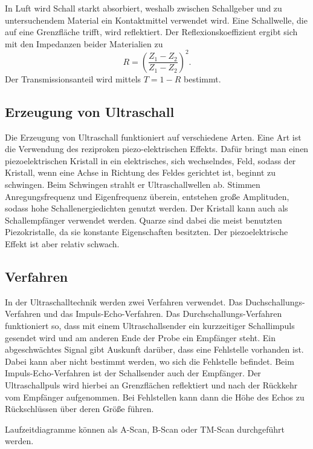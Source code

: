 In Luft wird Schall starkt absorbiert, weshalb zwischen 
Schallgeber und zu untersuchendem Material ein Kontaktmittel 
verwendet wird. 
Eine Schallwelle, die auf eine Grenzfläche trifft, wird 
reflektiert. Der Reflexionskoeffizient ergibt sich mit den 
Impedanzen beider Materialien zu 
\begin{equation*}
    R = (\frac{Z_1-Z_2}{Z_1-Z_2})^2.
\end{equation*}
Der Transmissionsanteil wird mittels $T= 1-R$ bestimmt. 

\subsection{Erzeugung von Ultraschall}
\noindent Die Erzeugung von Ultraschall funktioniert auf verschiedene 
Arten. Eine Art ist die Verwendung des reziproken 
piezo-elektrischen Effekts. Dafür bringt man einen 
piezoelektrischen Kristall in ein elektrisches, sich
wechselndes, Feld, sodass der Kristall, wenn eine Achse in 
Richtung des Feldes gerichtet ist, beginnt zu 
schwingen. Beim Schwingen strahlt er Ultraschallwellen ab. 
Stimmen Anregungsfrequenz und Eigenfrequenz überein, 
entstehen große Amplituden, sodass hohe Schallenergiedichten 
genutzt werden. Der Kristall kann auch als Schallempfänger 
verwendet werden. Quarze sind dabei die meist benutzten 
Piezokristalle, da sie konstante Eigenschaften besitzten. 
Der piezoelektrische Effekt ist aber relativ schwach. 

\subsection{Verfahren}
In der Ultraschalltechnik werden zwei Verfahren verwendet. 
Das Duchschallungs-Verfahren und das Impuls-Echo-Verfahren. 
\newline
Das Durchschallungs-Verfahren funktioniert so, dass mit einem 
Ultraschallsender ein kurzzeitiger Schallimpuls gesendet wird 
und am anderen Ende der Probe ein Empfänger steht. Ein 
abgeschwächtes Signal gibt Auskunft darüber, dass eine 
Fehlstelle vorhanden ist. Dabei kann aber nicht bestimmt 
werden, wo sich die Fehlstelle befindet.
\newline
Beim Impuls-Echo-Verfahren ist der Schallsender auch der 
Empfänger. Der Ultraschallpuls wird hierbei an Grenzflächen 
reflektiert und nach der Rückkehr vom Empfänger aufgenommen. 
Bei Fehlstellen kann dann die Höhe des Echos zu Rückschlüssen 
über deren Größe führen. 

%
Laufzeitdiagramme können als A-Scan, B-Scan oder TM-Scan 
durchgeführt werden. %
